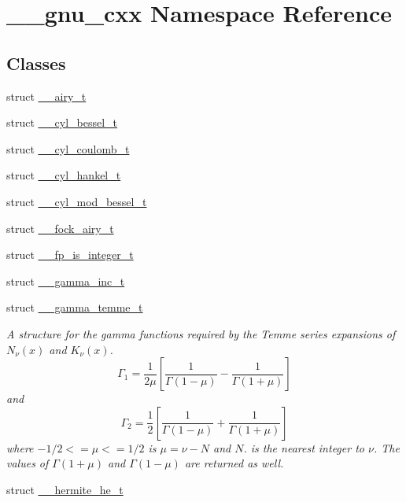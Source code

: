 \hypertarget{namespace____gnu__cxx}{}\section{\+\_\+\+\_\+gnu\+\_\+cxx Namespace Reference}
\label{namespace____gnu__cxx}
\subsection*{Classes}
\begin{DoxyCompactItemize}
\item 
struct \hyperlink{struct____gnu__cxx_1_1____airy__t}{\+\_\+\+\_\+airy\+\_\+t}
\item 
struct \hyperlink{struct____gnu__cxx_1_1____cyl__bessel__t}{\+\_\+\+\_\+cyl\+\_\+bessel\+\_\+t}
\item 
struct \hyperlink{struct____gnu__cxx_1_1____cyl__coulomb__t}{\+\_\+\+\_\+cyl\+\_\+coulomb\+\_\+t}
\item 
struct \hyperlink{struct____gnu__cxx_1_1____cyl__hankel__t}{\+\_\+\+\_\+cyl\+\_\+hankel\+\_\+t}
\item 
struct \hyperlink{struct____gnu__cxx_1_1____cyl__mod__bessel__t}{\+\_\+\+\_\+cyl\+\_\+mod\+\_\+bessel\+\_\+t}
\item 
struct \hyperlink{struct____gnu__cxx_1_1____fock__airy__t}{\+\_\+\+\_\+fock\+\_\+airy\+\_\+t}
\item 
struct \hyperlink{struct____gnu__cxx_1_1____fp__is__integer__t}{\+\_\+\+\_\+fp\+\_\+is\+\_\+integer\+\_\+t}
\item 
struct \hyperlink{struct____gnu__cxx_1_1____gamma__inc__t}{\+\_\+\+\_\+gamma\+\_\+inc\+\_\+t}
\item 
struct \hyperlink{struct____gnu__cxx_1_1____gamma__temme__t}{\+\_\+\+\_\+gamma\+\_\+temme\+\_\+t}
\begin{DoxyCompactList}\small\item\em A structure for the gamma functions required by the Temme series expansions of $ N_\nu(x) $ and $ K_\nu(x) $. \[ \Gamma_1 = \frac{1}{2\mu} \left[\frac{1}{\Gamma(1 - \mu)} - \frac{1}{\Gamma(1 + \mu)}\right] \] and \[ \Gamma_2 = \frac{1}{2} \left[\frac{1}{\Gamma(1 - \mu)} + \frac{1}{\Gamma(1 + \mu)}\right] \] where $ -1/2 <= \mu <= 1/2 $ is $ \mu = \nu - N $ and $ N $. is the nearest integer to $ \nu $. The values of $ \Gamma(1 + \mu) $ and $ \Gamma(1 - \mu) $ are returned as well. \end{DoxyCompactList}\item 
struct \hyperlink{struct____gnu__cxx_1_1____hermite__he__t}{\+\_\+\+\_\+hermite\+\_\+he\+\_\+t}

\end{DoxyCompactItemize}
